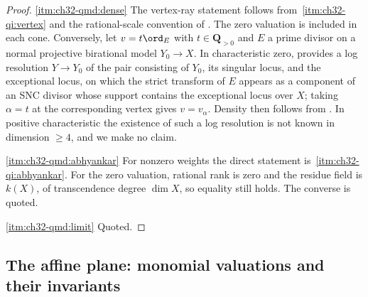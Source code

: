 \begin{proof}
\cref{itm:ch32-qmd:dense}  The vertex-ray statement follows from
\,\cref{itm:ch32-qi:vertex} and
the rational-scale convention of .  The zero
valuation is included in each cone.  Conversely, let $v=t\ord_E$ with $t\in\mathbf Q_{>0}$ and $E$ a prime
divisor on a normal projective birational model $Y_0\to X$.  In
characteristic zero,  provides a log resolution
$Y\to Y_0$ of the pair consisting of $Y_0$, its singular locus, and the
exceptional locus, on which the strict transform of $E$ appears as a
component of an SNC divisor whose support contains the exceptional locus over
$X$; taking $\alpha=t$ at the corresponding vertex gives
$v=v_\alpha$.  Density then follows from
.  In positive characteristic the
existence of such a log resolution is not known in dimension $\geq4$, and
we make no claim.

\cref{itm:ch32-qmd:abhyankar}  For nonzero weights the direct statement
is \,\cref{itm:ch32-qi:abhyankar}.
For the zero valuation, rational rank is zero and the residue field is
$k(X)$, of transcendence degree $\dim X$, so equality still holds.
The converse is quoted.

\cref{itm:ch32-qmd:limit}  Quoted.
\end{proof}

\subsection{The affine plane: monomial valuations and their invariants}
\label{sec:ch32-affine-plane}

